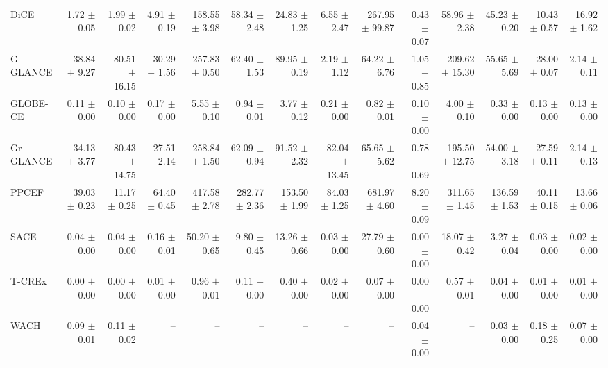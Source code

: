 \begin{table}[htbp]
{\begin{tabular}{lrrrrrrrrrrrrr}
DiCE & 1.72 $\pm$ 0.05 & 1.99 $\pm$ 0.02 & 4.91 $\pm$ 0.19 & 158.55 $\pm$ 3.98 & 58.34 $\pm$ 2.48 & 24.83 $\pm$ 1.25 & 6.55 $\pm$ 2.47 & 267.95 $\pm$ 99.87 & 0.43 $\pm$ 0.07 & 58.96 $\pm$ 2.38 & 45.23 $\pm$ 0.20 & 10.43 $\pm$ 0.57 & 16.92 $\pm$ 1.62 \\
G-GLANCE & 38.84 $\pm$ 9.27 & 80.51 $\pm$ 16.15 & 30.29 $\pm$ 1.56 & 257.83 $\pm$ 0.50 & 62.40 $\pm$ 1.53 & 89.95 $\pm$ 0.19 & 2.19 $\pm$ 1.12 & 64.22 $\pm$ 6.76 & 1.05 $\pm$ 0.85 & 209.62 $\pm$ 15.30 & 55.65 $\pm$ 5.69 & 28.00 $\pm$ 0.07 & 2.14 $\pm$ 0.11 \\
GLOBE-CE & 0.11 $\pm$ 0.00 & 0.10 $\pm$ 0.00 & 0.17 $\pm$ 0.00 & 5.55 $\pm$ 0.10 & 0.94 $\pm$ 0.01 & 3.77 $\pm$ 0.12 & 0.21 $\pm$ 0.00 & 0.82 $\pm$ 0.01 & 0.10 $\pm$ 0.00 & 4.00 $\pm$ 0.10 & 0.33 $\pm$ 0.00 & 0.13 $\pm$ 0.00 & 0.13 $\pm$ 0.00 \\
Gr-GLANCE & 34.13 $\pm$ 3.77 & 80.43 $\pm$ 14.75 & 27.51 $\pm$ 2.14 & 258.84 $\pm$ 1.50 & 62.09 $\pm$ 0.94 & 91.52 $\pm$ 2.32 & 82.04 $\pm$ 13.45 & 65.65 $\pm$ 5.62 & 0.78 $\pm$ 0.69 & 195.50 $\pm$ 12.75 & 54.00 $\pm$ 3.18 & 27.59 $\pm$ 0.11 & 2.14 $\pm$ 0.13 \\
PPCEF & 39.03 $\pm$ 0.23 & 11.17 $\pm$ 0.25 & 64.40 $\pm$ 0.45 & 417.58 $\pm$ 2.78 & 282.77 $\pm$ 2.36 & 153.50 $\pm$ 1.99 & 84.03 $\pm$ 1.25 & 681.97 $\pm$ 4.60 & 8.20 $\pm$ 0.09 & 311.65 $\pm$ 1.45 & 136.59 $\pm$ 1.53 & 40.11 $\pm$ 0.15 & 13.66 $\pm$ 0.06 \\
SACE & 0.04 $\pm$ 0.00 & 0.04 $\pm$ 0.00 & 0.16 $\pm$ 0.01 & 50.20 $\pm$ 0.65 & 9.80 $\pm$ 0.45 & 13.26 $\pm$ 0.66 & 0.03 $\pm$ 0.00 & 27.79 $\pm$ 0.60 & 0.00 $\pm$ 0.00 & 18.07 $\pm$ 0.42 & 3.27 $\pm$ 0.04 & 0.03 $\pm$ 0.00 & 0.02 $\pm$ 0.00 \\
T-CREx & 0.00 $\pm$ 0.00 & 0.00 $\pm$ 0.00 & 0.01 $\pm$ 0.00 & 0.96 $\pm$ 0.01 & 0.11 $\pm$ 0.00 & 0.40 $\pm$ 0.00 & 0.02 $\pm$ 0.00 & 0.07 $\pm$ 0.00 & 0.00 $\pm$ 0.00 & 0.57 $\pm$ 0.01 & 0.04 $\pm$ 0.00 & 0.01 $\pm$ 0.00 & 0.01 $\pm$ 0.00 \\
WACH & 0.09 $\pm$ 0.01 & 0.11 $\pm$ 0.02 & -- & -- & -- & -- & -- & -- & 0.04 $\pm$ 0.00 & -- & 0.03 $\pm$ 0.00 & 0.18 $\pm$ 0.25 & 0.07 $\pm$ 0.00 \\
\bottomrule
\end{tabular}}
\end{table}